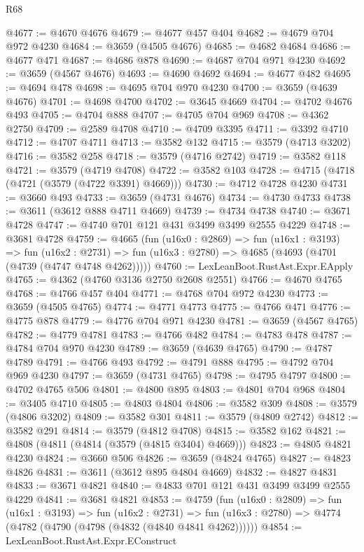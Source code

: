 \begin{lexlean}{R68}
\begin{coremodule}
@4677 := @4670 @4676
@4679 := @4677 @457 @404
@4682 := @4679 @704 @972 @4230
@4684 := @3659 (@4505 @4676)
@4685 := @4682 @4684
@4686 := @4677 @471
@4687 := @4686 @878
@4690 := @4687 @704 @971 @4230
@4692 := @3659 (@4567 @4676)
@4693 := @4690 @4692
@4694 := @4677 @482
@4695 := @4694 @478
@4698 := @4695 @704 @970 @4230
@4700 := @3659 (@4639 @4676)
@4701 := @4698 @4700
@4702 := @3645 @4669
@4704 := @4702 @4676 @493
@4705 := @4704 @888
@4707 := @4705 @704 @969
@4708 := @4362 @2750
@4709 := @2589 @4708
@4710 := @4709 @3395
@4711 := @3392 @4710
@4712 := @4707 @4711
@4713 := @3582 @132
@4715 := @3579 (@4713 @3202)
@4716 := @3582 @258
@4718 := @3579 (@4716 @2742)
@4719 := @3582 @118
@4721 := @3579 (@4719 @4708)
@4722 := @3582 @103
@4728 := @4715 (@4718 (@4721 (@3579 (@4722 @3391) @4669)))
@4730 := @4712 @4728 @4230
@4731 := @3660 @493
@4733 := @3659 (@4731 @4676)
@4734 := @4730 @4733
@4738 := @3611 (@3612 @888 @4711 @4669)
@4739 := @4734 @4738
@4740 := @3671 @4728
@4747 := @4740 @701 @121 @431 @3499 @3499 @2555 @4229
@4748 := @3681 @4728
@4759 := @4665
    (fun (u16x0 : @2869) =>
    fun (u16x1 : @3193) =>
    fun (u16x2 : @2731) => fun (u16x3 : @2780) => @4685 (@4693 (@4701 (@4739 (@4747 @4748 @4262)))))
@4760 := LexLeanBoot.RustAst.Expr.EApply
@4765 := @4362 (@4760 @3136 @2750 @2608 @2551)
@4766 := @4670 @4765
@4768 := @4766 @457 @404
@4771 := @4768 @704 @972 @4230
@4773 := @3659 (@4505 @4765)
@4774 := @4771 @4773
@4775 := @4766 @471
@4776 := @4775 @878
@4779 := @4776 @704 @971 @4230
@4781 := @3659 (@4567 @4765)
@4782 := @4779 @4781
@4783 := @4766 @482
@4784 := @4783 @478
@4787 := @4784 @704 @970 @4230
@4789 := @3659 (@4639 @4765)
@4790 := @4787 @4789
@4791 := @4766 @493
@4792 := @4791 @888
@4795 := @4792 @704 @969 @4230
@4797 := @3659 (@4731 @4765)
@4798 := @4795 @4797
@4800 := @4702 @4765 @506
@4801 := @4800 @895
@4803 := @4801 @704 @968
@4804 := @3405 @4710
@4805 := @4803 @4804
@4806 := @3582 @309
@4808 := @3579 (@4806 @3202)
@4809 := @3582 @301
@4811 := @3579 (@4809 @2742)
@4812 := @3582 @291
@4814 := @3579 (@4812 @4708)
@4815 := @3582 @162
@4821 := @4808 (@4811 (@4814 (@3579 (@4815 @3404) @4669)))
@4823 := @4805 @4821 @4230
@4824 := @3660 @506
@4826 := @3659 (@4824 @4765)
@4827 := @4823 @4826
@4831 := @3611 (@3612 @895 @4804 @4669)
@4832 := @4827 @4831
@4833 := @3671 @4821
@4840 := @4833 @701 @121 @431 @3499 @3499 @2555 @4229
@4841 := @3681 @4821
@4853 := @4759
    (fun (u16x0 : @2809) =>
    fun (u16x1 : @3193) =>
    fun (u16x2 : @2731) =>
    fun (u16x3 : @2780) => @4774 (@4782 (@4790 (@4798 (@4832 (@4840 @4841 @4262))))))
@4854 := LexLeanBoot.RustAst.Expr.EConstruct

\end{coremodule}
\end{lexlean}
